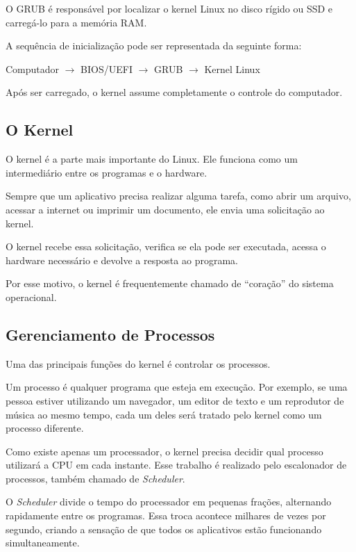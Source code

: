 \documentclass{article}
\begin{document}
O GRUB é responsável por localizar o kernel Linux no disco rígido ou SSD e carregá-lo para a memória RAM.

A sequência de inicialização pode ser representada da seguinte forma:

\begin{center}
Computador $\rightarrow$ BIOS/UEFI $\rightarrow$ GRUB $\rightarrow$ Kernel Linux
\end{center}

Após ser carregado, o kernel assume completamente o controle do computador.

\subsection{O Kernel}

O kernel é a parte mais importante do Linux. Ele funciona como um intermediário entre os programas e o hardware.

Sempre que um aplicativo precisa realizar alguma tarefa, como abrir um arquivo, acessar a internet ou imprimir um documento, ele envia uma solicitação ao kernel.

O kernel recebe essa solicitação, verifica se ela pode ser executada, acessa o hardware necessário e devolve a resposta ao programa.

Por esse motivo, o kernel é frequentemente chamado de ``coração'' do sistema operacional.

\subsection{Gerenciamento de Processos}

Uma das principais funções do kernel é controlar os processos.

Um processo é qualquer programa que esteja em execução. Por exemplo, se uma pessoa estiver utilizando um navegador, um editor de texto e um reprodutor de música ao mesmo tempo, cada um deles será tratado pelo kernel como um processo diferente.

Como existe apenas um processador, o kernel precisa decidir qual processo utilizará a CPU em cada instante. Esse trabalho é realizado pelo escalonador de processos, também chamado de \textit{Scheduler}.

O \textit{Scheduler} divide o tempo do processador em pequenas frações, alternando rapidamente entre os programas. Essa troca acontece milhares de vezes por segundo, criando a sensação de que todos os aplicativos estão funcionando simultaneamente.
\end{document}
